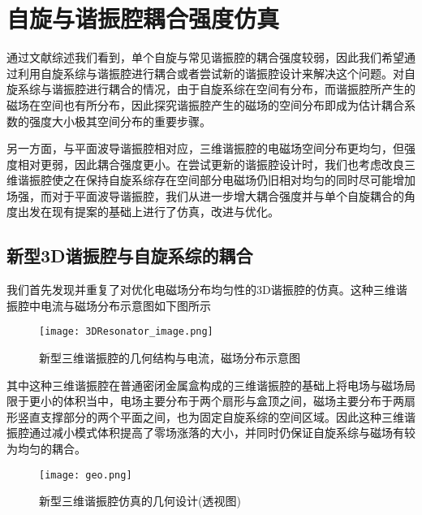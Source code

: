 \chapter{自旋与谐振腔耦合强度仿真}
\label{cha:spin_simulation}



        通过文献综述我们看到，单个自旋与常见谐振腔的耦合强度较弱，因此我们希望通过利用自旋系综与谐振腔进行耦合或者尝试新的谐振腔设计来解决这个问题。对自旋系综与谐振腔进行耦合的情况，由于自旋系综在空间有分布，而谐振腔所产生的磁场在空间也有所分布，因此探究谐振腔产生的磁场的空间分布即成为估计耦合系数的强度大小极其空间分布的重要步骤。

        另一方面，与平面波导谐振腔相对应，三维谐振腔的电磁场空间分布更均匀，但强度相对更弱，因此耦合强度更小。在尝试更新的谐振腔设计时，我们也考虑改良三维谐振腔使之在保持自旋系综存在空间部分电磁场仍旧相对均匀的同时尽可能增加场强，而对于平面波导谐振腔，我们从进一步增大耦合强度并与单个自旋耦合的角度出发在现有提案\cite{sarabi2017prospective}的基础上进行了仿真，改进与优化。

        \section{新型3D谐振腔与自旋系综的耦合} %
        \label{sec:新型3d谐振腔与自旋系综的耦合}

        我们首先发现并重复了对优化电磁场分布均匀性的3D谐振腔的仿真\cite{Angerer2016}。这种三维谐振腔中电流与磁场分布示意图如下图所示

        \begin{figure}[h]
                \centering
            \texttt{[image: 3DResonator\_image.png]}
            \caption{新型三维谐振腔的几何结构与电流，磁场分布示意图\cite{Angerer2016}}
            \label{fig:3D_Resonator_image}
        \end{figure}
        其中这种三维谐振腔在普通密闭金属盒构成的三维谐振腔的基础上将电场与磁场局限于更小的体积当中，电场主要分布于两个扇形与盒顶之间，磁场主要分布于两扇形竖直支撑部分的两个平面之间，也为固定自旋系综的空间区域。因此这种三维谐振腔通过减小模式体积提高了零场涨落的大小，并同时仍保证自旋系综与磁场有较为均匀的耦合。


        \begin{figure}[h]
                \centering
            \texttt{[image: geo.png]}
            \caption{新型三维谐振腔仿真的几何设计(透视图)}
            \label{fig:geo_3DResonator}
        \end{figure}

